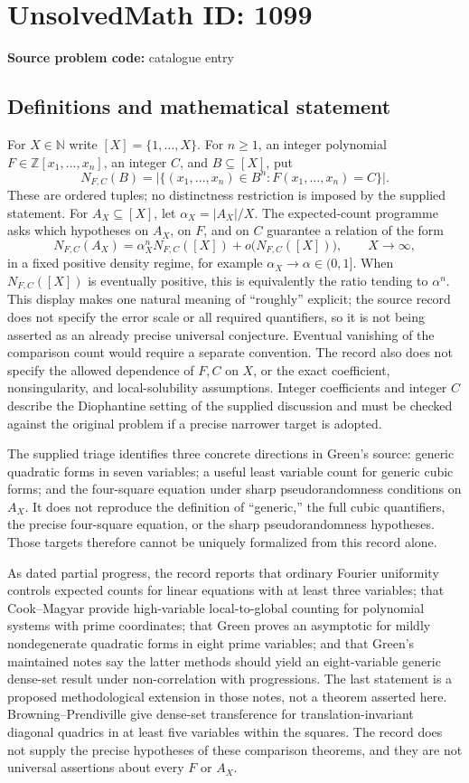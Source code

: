 \documentclass[11pt]{article}
\newcommand{\N}{\mathbb{N}}
\newcommand{\Z}{\mathbb{Z}}
\begin{document}
\section*{UnsolvedMath ID: 1099}
\textbf{Source problem code:} catalogue entry
\subsection{Definitions and mathematical statement}
For $X\in\N$ write $[X]=\{1,\ldots,X\}$. For $n\ge1$, an integer polynomial $F\in\Z[x_1,\ldots,x_n]$, an integer $C$, and $B\subseteq[X]$, put
\[
 N_{F,C}(B)=\bigl|\{(x_1,\ldots,x_n)\in B^n:F(x_1,\ldots,x_n)=C\}\bigr|.
\]
These are ordered tuples; no distinctness restriction is imposed by the supplied statement. For $A_X\subseteq[X]$, let $\alpha_X=|A_X|/X$. The expected-count programme asks which hypotheses on $A_X$, on $F$, and on $C$ guarantee a relation of the form
\[
 N_{F,C}(A_X)=\alpha_X^nN_{F,C}([X])
                 +o\bigl(N_{F,C}([X])\bigr),\qquad X\longrightarrow\infty,
\]
in a fixed positive density regime, for example $\alpha_X\longrightarrow\alpha\in(0,1]$. When $N_{F,C}([X])$ is eventually positive, this is equivalently the ratio tending to $\alpha^n$. This display makes one natural meaning of ``roughly'' explicit; the source record does not specify the error scale or all required quantifiers, so it is not being asserted as an already precise universal conjecture. Eventual vanishing of the comparison count would require a separate convention. The record also does not specify the allowed dependence of $F,C$ on $X$, or the exact coefficient, nonsingularity, and local-solubility assumptions. Integer coefficients and integer $C$ describe the Diophantine setting of the supplied discussion and must be checked against the original problem if a precise narrower target is adopted.

The supplied triage identifies three concrete directions in Green's source: generic quadratic forms in seven variables; a useful least variable count for generic cubic forms; and the four-square equation under sharp pseudorandomness conditions on $A_X$. It does not reproduce the definition of ``generic,'' the full cubic quantifiers, the precise four-square equation, or the sharp pseudorandomness hypotheses. Those targets therefore cannot be uniquely formalized from this record alone.

As dated partial progress, the record reports that ordinary Fourier uniformity controls expected counts for linear equations with at least three variables; that Cook--Magyar provide high-variable local-to-global counting for polynomial systems with prime coordinates; that Green proves an asymptotic for mildly nondegenerate quadratic forms in eight prime variables; and that Green's maintained notes say the latter methods should yield an eight-variable generic dense-set result under non-correlation with progressions. The last statement is a proposed methodological extension in those notes, not a theorem asserted here. Browning--Prendiville give dense-set transference for translation-invariant diagonal quadrics in at least five variables within the squares. The record does not supply the precise hypotheses of these comparison theorems, and they are not universal assertions about every $F$ or $A_X$.
\end{document}
